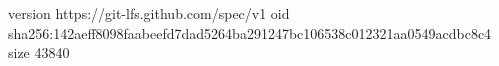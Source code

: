 version https://git-lfs.github.com/spec/v1
oid sha256:142aeff8098faabeefd7dad5264ba291247bc106538c012321aa0549acdbc8c4
size 43840
